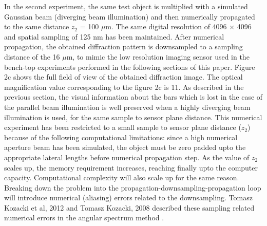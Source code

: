 \documentclass[journal]{IEEEtran}
\begin{document}
In the second experiment, the same test object is multiplied with a simulated Gaussian beam (diverging beam illumination) and then numerically propagated to the same distance $z_2$ = 100 $\mu$m. The same digital resolution of 4096 $\times$ 4096 and spatial sampling of 125 nm has been maintained. After numerical propagation, the obtained diffraction pattern is downsampled to a sampling distance of the 16 $\mu$m, to mimic the low resolution imaging sensor used in the bench-top experiments performed in the following sections of this paper. Figure 2c shows the full field of view of the obtained diffraction image. The optical magnification value corresponding to the figure 2c is 11. As described in the previous section, the visual information about the bars which is lost in the case of the parallel beam illumination is well preserved when a highly diverging beam illumination is used, for the same sample to sensor plane distance.
This numerical experiment has been restricted to a small sample to sensor plane distance ($z_2$) because of the following computational limitations: since a high numerical aperture beam has been simulated, the object must be zero padded upto the appropriate lateral lengths before numerical propagation step. As the value of $z_2$ scales up, the memory requirement increases, reaching finally upto the computer capacity. Computational complexity will also scale up for the same reason. Breaking down the problem into the propagation-downsampling-propagation loop will introduce numerical (aliasing) errors related to the downsampling. Tomasz Kozacki et al, 2012 and Tomasz Kozacki, 2008 described these sampling related numerical errors in the angular spectrum method \cite{kozacki2012computation,kozacki2008numerical}.
\end{document}
